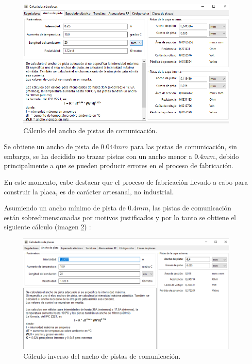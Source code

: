 \begin{figure}[H]
\centering 
\includegraphics[width=0.9\linewidth]{pictures/AnchoPistaRestoMinimo.PNG}
\caption{Cálculo del ancho de pistas de comunicación.}
\label{fig:Ancho_Comunicacion}
\end{figure}

Se obtiene un ancho de pista de $0.044mm$ para las pistas de comunicación, sin embargo, se ha decidido no trazar pistas con un ancho menor a $0.4mm$, debido principalmente a que se pueden producir errores en el proceso de fabricación.

En este momento, cabe destacar que el proceso de fabricación llevado a cabo para construir la placa, es de carácter artesanal, no industrial.

Asumiendo un ancho mínimo de pista de $0.4mm$, las pistas de comunicación están sobredimensionadas por motivos justificados y por lo tanto se obtiene el siguiente cálculo (imagen \ref{fig:Calculo_Inverso}) :

\begin{figure}[H]
\centering 
\includegraphics[width=0.9\linewidth]{pictures/AnchoPistaResto.PNG}
\caption{Cálculo inverso del ancho de pistas de comunicación.}
\label{fig:Calculo_Inverso}
\end{figure}

